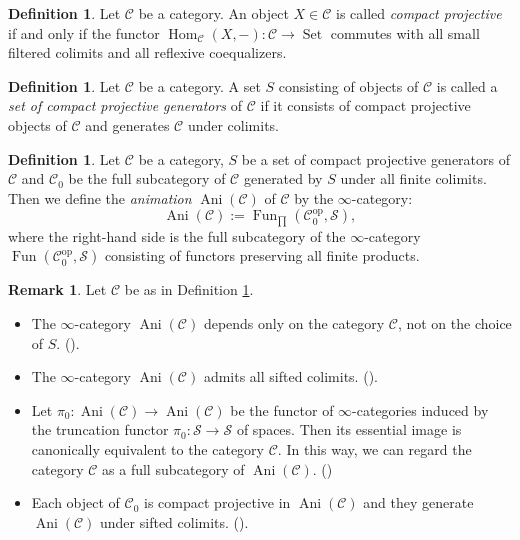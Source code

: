 \documentclass[11pt, a4paper]{amsart}
\theoremstyle{plain}
\theoremstyle{definition}
\newtheorem{definition}[theorem]{Definition}
\newtheorem{remark}[theorem]{Remark}
\begin{document}
\begin{definition}\label{def3.1}
    Let $\mathscr C$ be a category. An object $X\in \mathscr C$ is called {\em compact projective} if and only if the functor $\operatorname{Hom}_{\mathscr C}(X,-):\mathscr C\to \operatorname{Set}$ commutes with all small filtered colimits and all reflexive coequalizers.
    
\end{definition}
\begin{definition}\label{def3.2}
    Let $\mathscr C$ be a category. A set $S$ consisting of objects of $\mathscr C$ is called a {\em set of compact projective generators} of $\mathscr C$ if it consists of compact projective objects of $\mathscr C$ and generates $\mathscr C$ under colimits. 
\end{definition}

\begin{definition}\label{def3.3}
    Let $\mathscr C$ be a category, $S$ be a set of compact projective generators of $\mathscr C$ and $\mathscr C_0$ be the full subcategory of $\mathscr C$ generated by $S$ under all finite colimits. Then we define the {\em animation} $\operatorname{Ani}(\mathscr C)$ of $\mathscr C$ by the $\infty$-category:\[\operatorname{Ani}(\mathscr C):=\operatorname{Fun}_{\prod}(\mathscr C_0^{\mathrm{op}},\mathcal S),\] where the right-hand side is the full subcategory of the $\infty$-category $\operatorname{Fun}(\mathscr C_0^{\mathrm{op}},\mathcal S)$ consisting of functors preserving all finite products.
\end{definition}
\begin{remark}\label{rem3.4}
Let $\mathscr C$ be as in Definition \ref{def3.3}. 
\begin{itemize}
    \item The $\infty$-category $\operatorname{Ani}(\mathscr C)$ depends only on the category $\mathscr C$, not on the choice of $S$. (\cite[Remark A.20]{Mao24}).
    \item The $\infty$-category $\operatorname{Ani}(\mathscr C)$ admits all sifted colimits. (\cite[Proposition 5.5.8.10]{Lur09}).
    \item  Let $\pi_0:\operatorname{Ani}(\mathscr C)\to \operatorname{Ani}(\mathscr C)$ be the functor of $\infty$-categories induced by the truncation functor $\pi_0:\mathcal S\to \mathcal S$ of spaces. Then its essential image is canonically equivalent to the category $\mathscr C$. In this way, we can regard the category $\mathscr C$ as a full subcategory of $\operatorname{Ani}(\mathscr C)$. (\cite[Remark 5.5.8.26]{Lur09})
    \item Each object of $\mathscr C_0$ is compact projective in  $\operatorname{Ani}(\mathscr C)$ and they generate $\operatorname{Ani}(\mathscr C)$ under sifted colimits. (\cite[Proposition 5.5.8.22]{Lur09}).
\end{itemize}
    
\end{remark}
\end{document}
